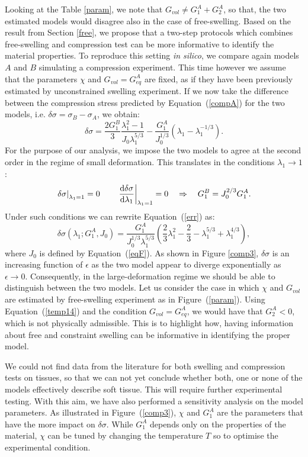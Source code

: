 Looking at the Table  \ref{param}, we note that $G_{vol}\neq G^A_{1}+G^A_2$, so that, the two estimated models would disagree also in the case of free-swelling. Based on the result from Section \ref{free}, we propose that a two-step protocols which combines free-swelling and compression test can be more informative to identify the material properties. To reproduce this setting \textit{in silico}, we compare again models $A$ and $B$ simulating a compression experiment. This time however we assume that the parameters $\chi$ and $G_{vol}=G^A_{eq}$ are fixed, as if they have been previously estimated by unconstrained swelling experiment. If we now take the difference between the compression stress predicted by Equation~(\ref{compA}) for the two models, i.e. $\delta \sigma= \sigma_{B}-\sigma_{A}$, we obtain:
\begin{equation}
\delta \sigma = \frac{2 G_1^{B}}{3} \frac{\lambda_1^2-1}{J_0\lambda_1^{5/3}} - \frac{G_1^A}{J_0^{1/3}}(\lambda_1-\lambda_1^{-1/3}).\label{err}
\end{equation}
For the purpose of our analysis, we impose the two models to agree at the second order in the regime of small deformation. This translates in the conditions $\lambda_1\rightarrow 1$:
\begin{equation}
\left.\delta \sigma\right|_{\lambda_1=1}=0 \qquad \left.\frac{\text{d} \delta \sigma}{\text{d} \lambda_1}\right|_{\lambda_1=1}=0 \quad\Rightarrow \quad G_1^{B} = J_0^{2/3}G_1^A.\label{temp14}
\end{equation}
Under such conditions we can rewrite Equation~(\ref{err}) as:
\begin{equation}
\delta \sigma(\lambda_1;G^A_1,J_0) = \frac{G_1^A}{J^{1/3}_0\lambda_1^{5/3}} \left(\frac{2}{3}\lambda^2_1-\frac{2}{3}-\lambda_1^{5/3}+\lambda_1^{4/3}\right), 
\end{equation}
where $J_0$ is defined by Equation~(\ref{eqF}). As shown in Figure \ref{comp3}, $\delta \sigma$ is an increasing function of $\epsilon$ as the two model appear to diverge exponentially as $\epsilon \rightarrow 0 $. Consequently, in the large-deformation regime we should be able to distinguish between the two models. Let us consider the case in which $\chi$ and $G_{vol}$ are estimated by free-swelling experiment as in Figure~(\ref{param}). Using Equation~(\ref{temp14}) and the condition $G_{vol}=G^A_{eq}$, we would have that $G^A_2<0$, which is not physically admissible. This is to highlight how, having information about free and constraint swelling can be informative in identifying the proper model. 

We could not find data from the literature for both swelling and compression tests on tissues, so that we can not yet conclude whether both, one or none of the models effectively describe soft tissue. This will require further experimental testing. With this aim, we have also performed a sensitivity analysis on the model parameters. As illustrated in Figure~(\ref{comp3}), $\chi$ and $G_1^A$ are the parameters that have the more impact on $\delta\sigma$. While $G_1^A$ depends only on the properties of the material, $\chi$ can be tuned by changing the temperature $T$ so to optimise the experimental condition. 


